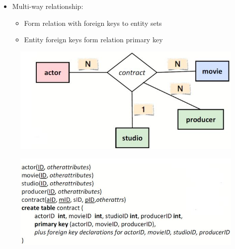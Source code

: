 \documentclass[conference]{IEEEtran}
\begin{document}
\pagebreak

\begin{itemize}
    \item Multi-way relationship:
    \begin{itemize}
        \item Form relation with foreign keys to entity sets
        \item Entity foreign keys form relation primary key
    \end{itemize}
\end{itemize}
\begin{figure} [h!]
    \centering
    \includegraphics[scale=0.5]{Ex30.JPG}
\end{figure}
\begin{figure} [h!]
    \centering
    \includegraphics[scale=0.5]{Ex31.JPG}
\end{figure}
\end{document}

